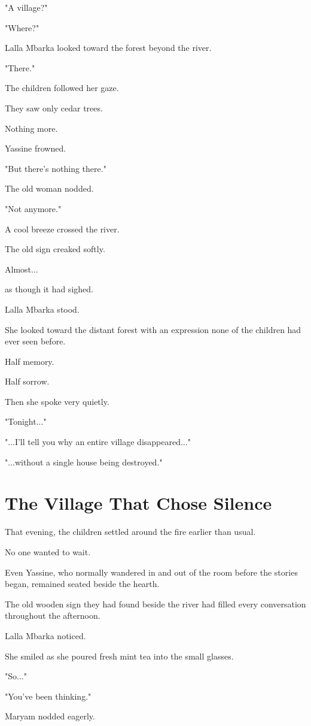 \documentclass[12pt,openany]{book}
\begin{document}
"A village?"

"Where?"

Lalla Mbarka looked toward the forest beyond the river.

"There."

The children followed her gaze.

They saw only cedar trees.

Nothing more.

Yassine frowned.

"But there's nothing there."

The old woman nodded.

"Not anymore."

A cool breeze crossed the river.

The old sign creaked softly.

Almost...

as though it had sighed.

Lalla Mbarka stood.

She looked toward the distant forest with an expression none of the children had ever seen before.

Half memory.

Half sorrow.

Then she spoke very quietly.

"Tonight..."

"...I'll tell you why an entire village disappeared..."

"...without a single house being destroyed."
\section*{The Village That Chose Silence}

That evening, the children settled around the fire earlier than usual.

No one wanted to wait.

Even Yassine, who normally wandered in and out of the room before the stories began, remained seated beside the hearth.

The old wooden sign they had found beside the river had filled every conversation throughout the afternoon.

Lalla Mbarka noticed.

She smiled as she poured fresh mint tea into the small glasses.

"So..."

"You've been thinking."

Maryam nodded eagerly.
\end{document}
